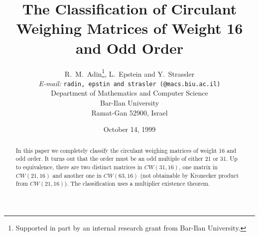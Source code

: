 
%
\setlength{\textwidth}{6.0in}
\setlength{\evensidemargin}{0.25in}
\setlength{\oddsidemargin}{0.25in}
\setlength{\textheight}{9.0in}
\setlength{\topmargin}{-0.5in}
\setlength{\parskip}{2mm}
\setlength{\baselineskip}{0.5\baselineskip}





\linespread{1.4}
\newcommand{\Z}{{\Bbb Z}}
\newtheorem{thm}{Theorem}[section]
\newtheorem{defn}{Definition}[section]
\newtheorem{prop}[thm]{Proposition}

\newtheorem{con}[thm]{Conclusion}
\newtheorem{obs}[thm]{Observation}
\newtheorem{cor}[thm]{Corollary}
\newtheorem{lem}[thm]{Lemma}
\newcommand{\pr}{\bf Proof}
\newtheorem{ex}[thm]{Example}


\title { The Classification of Circulant Weighing Matrices of Weight 16 
and Odd Order}
\author {R.\ M.\ Adin\thanks{Supported in part by an internal research grant 
from Bar-Ilan University.}, L.\ Epstein  and  Y.\ Strassler \\
{\it E-mail:}
{\tt radin, epstin and strasler (@macs.biu.ac.il)}\\ 
Department of Mathematics and Computer Science \\
Bar-Ilan University \\ 
Ramat-Gan 52900, Israel}
%
\date{October 14, 1999}
%
\maketitle

\begin{abstract}
In this paper we completely classify the circulant weighing matrices of 
weight 16 and odd order. 
It turns out that the order must be an odd multiple of either 21 or 31. 
Up to equivalence, there are two distinct matrices in 
$ CW(31,16) $, one matrix in $CW(21,16)$ and  another one in $CW(63,16)$ 
(not obtainable by Kronecker product from $CW(21,16)$).
The classification uses a multiplier existence theorem. 
	 
\end{abstract}

